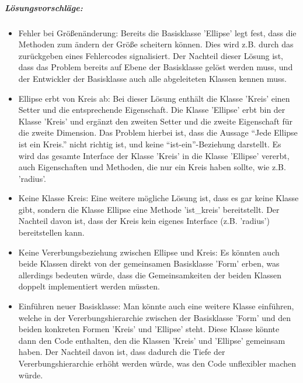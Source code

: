 				\subparagraph*{Lösungsvorschläge:}
					\begin{itemize}
						\item Fehler bei Größenänderung:
							Bereits die Basisklasse 'Ellipse' legt fest, dass die Methoden zum ändern der Größe scheitern
							können. Dies wird z.B. durch das zurückgeben eines Fehlercodes signalisiert. Der Nachteil
							dieser Lösung ist, dass das Problem bereits auf Ebene der Basisklasse gelöst werden muss, und
							der Entwickler der Basisklasse auch alle abgeleiteten Klassen kennen muss.
							
						\item Ellipse erbt von Kreis ab:
							Bei dieser Lösung enthält die Klasse 'Kreis' einen Setter und die entsprechende Eigenschaft. Die
							Klasse 'Ellipse' erbt bin der Klasse 'Kreis' und ergänzt den zweiten Setter und die zweite
							Eigenschaft für die zweite Dimension. Das Problem hierbei ist, dass die Aussage ``Jede Ellipse
							ist ein Kreis.'' nicht richtig ist, und keine ``ist-ein''-Beziehung darstellt. Es wird das
							gesamte Interface der Klasse 'Kreis' in die Klasse 'Ellipse' vererbt, auch Eigenschaften und
							Methoden, die nur ein Kreis haben sollte, wie z.B. 'radius'.
							
						\item Keine Klasse Kreis:
							Eine weitere mögliche Lösung ist, dass es gar keine Klasse gibt, sondern die Klasse Ellipse
							eine Methode 'ist\_kreis' bereitstellt. Der Nachteil davon ist, dass der Kreis kein eigenes
							Interface (z.B. 'radius') bereitstellen kann.
						
						\item Keine Vererbungsbeziehung zwischen Ellipse und Kreis:
							Es könnten auch beide Klassen direkt von der gemeinsamen Basisklasse 'Form' erben, was
							allerdings bedeuten würde, dass die Gemeinsamkeiten der beiden Klassen doppelt implementiert
							werden müssten.
							
						\item Einführen neuer Basisklasse:
							Man könnte auch eine weitere Klasse einführen, welche in der Vererbungshierarchie zwischen der
							Basisklasse 'Form' und den beiden konkreten Formen 'Kreis' und 'Ellipse' steht. Diese Klasse
							könnte dann den Code enthalten, den die Klassen 'Kreis' und 'Ellipse' gemeinsam haben. Der Nachteil
							davon ist, dass dadurch die Tiefe der Vererbungshierarchie erhöht werden würde, was den Code
							unflexibler machen würde.
					\end{itemize}
					
